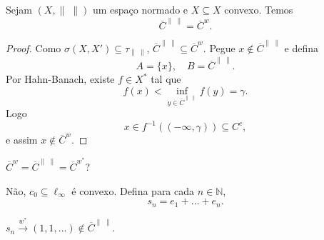 \documentclass[portuguese]{article}
\theoremstyle{definition}
\newcommand{\N}{\mathbb{N}}
\begin{document}
	\begin{coro}
		Sejam $(X,\|\;\|)$ um espaço normado e $X\subseteq X$ convexo. Temos
		\[\overline{C}^{\|\;\|}=\overline{C}^w.\]
	\end{coro}
	\begin{proof}
		Como $\sigma(X,X')\subseteq\tau_{\|\;\|}$, $\overline{C}^{\|\;\|}\subseteq\overline{C}^w$. Pegue $x\notin\overline{C}^{\|\;\|}$ e defina
		\[A=\{x\},\quad B=\overline{C}^{\|\;\|}.\]
		Por Hahn-Banach, existe $f\in X^*$ tal que
		\[f(x)<\inf_{y\in\overline{C}^{\|\;\|}}f(y)=\gamma.\]
		Logo
		\[x\in f^{-1}((-\infty,\gamma))\subseteq C^c,\]
		e assim $x\notin\overline{C}^w$.
	\end{proof}
	\begin{pregunta}
		$\overline{C}^w=\overline{C}^{\|\;\|}=\overline{C}^{w^*}$?
		
		Não, $c_0\subseteq\ell_\infty$ é convexo. Defina para cada $n\in\N$,
		\[s_n=e_1+\ldots+e_n.\]
		\begin{exer*}
			$s_n\overset{w^*}{\longrightarrow}(1,1,\ldots)\notin\overline{C}^{\|\;\|}$.
		\end{exer*}
	\end{pregunta}
	
\end{document}
